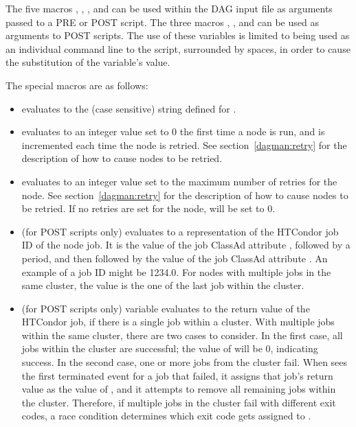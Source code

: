 
The five macros , , , 
 and  can be used within the
DAG input file as arguments passed to a PRE or POST script. 
The three macros , , 
and  can
be used as arguments to POST scripts.
The use of these variables is limited to being used
as an individual command
line  to the script,
surrounded by spaces, in order to cause the substitution of the
variable's value.

The special macros are as follows:

\begin{itemize}
\item {}
 evaluates to the (case sensitive) string
defined for .

\item {}
 evaluates to an 
integer value set to 0 the first time a node is run,
and is incremented each time the node is retried. 
See section~\ref{dagman:retry} for the description of how to cause
nodes to be retried. 

\item {}
 evaluates to an integer value set 
to the maximum number of retries for the node.
See section~\ref{dagman:retry} for the description of how to cause
nodes to be retried.  
If no retries are set for the node,
 will be set to 0.

\item {}
 (for POST scripts only)
evaluates to a representation of the HTCondor job ID of the node job.
It is the value of the job ClassAd attribute ,
followed by a period,
and then followed by the value of the job ClassAd attribute .
An example of a job ID might be 1234.0.
For nodes with multiple jobs in the same cluster,
the  value is the one of the last job within the cluster.

\item {}
 (for POST scripts only) variable evaluates to
the return value of the 
HTCondor job, if there is a single job within a cluster.
With multiple jobs within the same cluster,
there are two cases to consider.
In the first case, all jobs within the cluster are successful;
the value of  will be 0, indicating success.
In the second case,
one or more jobs from the cluster fail.
When  sees the first terminated event for a job that failed,
it assigns that job's return value as the value of ,
and it attempts to remove all remaining jobs within the cluster.
Therefore, if multiple jobs in the cluster fail with different exit codes,
a race condition determines which exit code gets assigned to .


\end{itemize}
